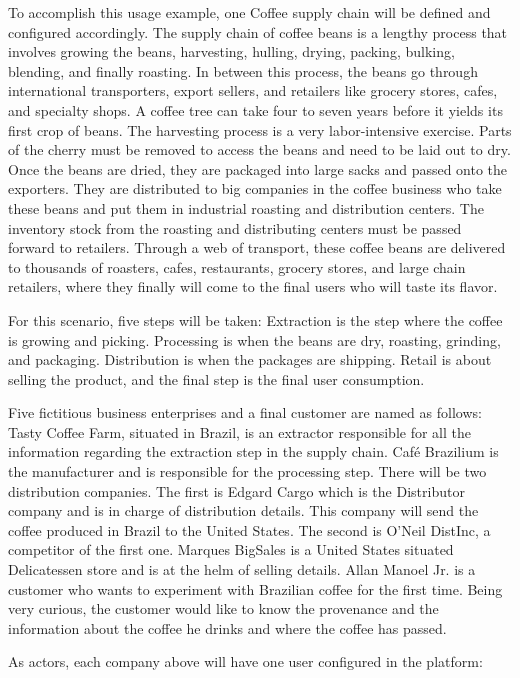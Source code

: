 To accomplish this usage example, one Coffee supply chain will be defined and configured accordingly. The supply chain of coffee beans is a lengthy process that involves growing the beans, harvesting, hulling, drying, packing, bulking, blending, and finally roasting. In between this process, the beans go through international transporters, export sellers, and retailers like grocery stores, cafes, and specialty shops. A coffee tree can take four to seven years before it yields its first crop of beans. The harvesting process is a very labor-intensive exercise. Parts of the cherry must be removed to access the beans and need to be laid out to dry. Once the beans are dried, they are packaged into large sacks and passed onto the exporters. They are distributed to big companies in the coffee business who take these beans and put them in industrial roasting and distribution centers. The inventory stock from the roasting and distributing centers must be passed forward to retailers. Through a web of transport, these coffee beans are delivered to thousands of roasters, cafes, restaurants, grocery stores, and large chain retailers, where they finally will come to the final users who will taste its flavor. 

For this scenario, five steps will be taken: Extraction is the step where the coffee is growing and picking. Processing is when the beans are dry, roasting, grinding, and packaging. Distribution is when the packages are shipping. Retail is about selling the product, and the final step is the final user consumption.

Five fictitious business enterprises and a final customer are named as follows: Tasty Coffee Farm, situated in Brazil, is an extractor responsible for all the information regarding the extraction step in the supply chain. Café Brazilium is the manufacturer and is responsible for the processing step. There will be two distribution companies. The first is Edgard Cargo which is the Distributor company and is in charge of distribution details. This company will send the coffee produced in Brazil to the United States. The second is O'Neil DistInc, a competitor of the first one. Marques BigSales is a United States situated Delicatessen store and is at the helm of selling details. Allan Manoel Jr. is a customer who wants to experiment with Brazilian coffee for the first time. Being very curious, the customer would like to know the provenance and the information about the coffee he drinks and where the coffee has passed.

As actors, each company above will have one user configured in the platform:  

